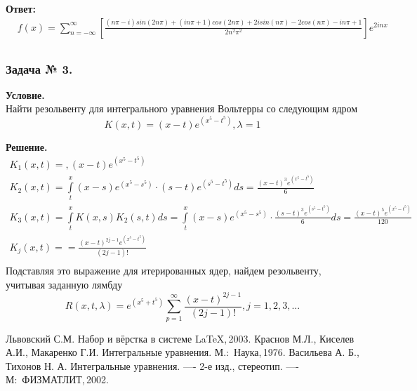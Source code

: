 \documentclass[12pt]{article}
\begin{document}
\noindent 
\textbf{Ответ:} 
\[ 
\begin{split} 
&f(x)= \sum_{n=-\infty}^\infty\left[\frac{(n\pi-i)sin{(2n\pi)}+(in\pi+1)cos{(2n\pi)}+2isin{(n\pi)}-2cos{(n\pi)}-in\pi+1}{2n^{2}\pi^{2}}\right] e^{2inx}\\[12pt] 
\end{split} 
\] 



\subsubsection*{\center Задача № 3.} 
{\bf Условие.~}\\ 
Найти резольвенту для интегрального уравнения Вольтерры со следующим ядром 
$$ K(x,t)= \displaystyle (x-t)e^{(x^5-t^5)}, \lambda=1$$ 

\noindent 
{\bf Решение.~}\\ 
\noindent 
$$ 
\begin{array}{lrc} 
K_1(x,t)=\displaystyle ,(x-t)e^{(x^5-t^5)} \\[12pt] 
K_2(x,t)=\displaystyle\int\limits_t^x (x-s)e^{(x^5-s^5)} \cdot (s-t)e^{(s^5-t^5)}ds = \displaystyle \frac{(x-t)^{3}e^{(x^5-t^5)}}{6} \\[12pt] 
K_3(x,t)=\displaystyle\int\limits_t^x K(x,s)K_2(s,t)ds = \displaystyle \int\limits_t^x (x-s)e^{(x^5-s^5)} \cdot \frac{(s-t)^{3}e^{(s^5-t^5)}}{6}ds= \displaystyle \frac{(x-t)^{5}e^{(x^5-t^5)}}{120} \\[12pt]
K_j(x,t)=\displaystyle= \frac{(x-t)^{2j-1}e^{(x^5-t^5)}}{(2j-1)!}\\[12pt]
\end{array} 
$$ 
Подставляя это выражение для итерированных ядер, найдем резольвенту, учитывая заданную лямбду 
$$ 
R(x,t,\lambda)=e^{(x^5+t^5)}\sum_{p=1}^\infty\frac{(x-t)^{2j-1}}{(2j-1)!}, j = 1, 2, 3, ...  
$$ 
\newpage 
{} 
\begin{thebibliography}{99} 
 Львовский С.М. Набор и вёрстка в системе \LaTeX,\,2003. 
 Краснов М.Л., Киселев А.И., Макаренко Г.И. Интегральные уравнения. М.:~Наука,\,1976. 
 Васильева А. Б., Тихонов Н. А. Интегральные уравнения. —- 2-е изд., стереотип. —- М:~ФИЗМАТЛИТ,\,2002. 
\end{thebibliography} 
\end{document}
